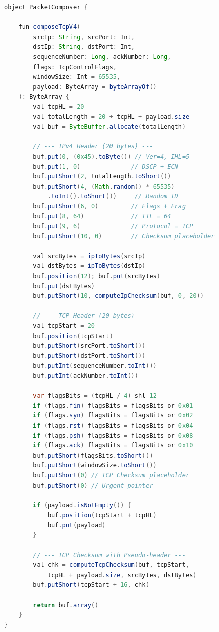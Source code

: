 \begin{lstlisting}[language=Java, caption={PacketComposer.kt --- IPv4 TCP packet synthesis}, label={lst:composer_tcp}]
object PacketComposer {

    fun composeTcpV4(
        srcIp: String, srcPort: Int,
        dstIp: String, dstPort: Int,
        sequenceNumber: Long, ackNumber: Long,
        flags: TcpControlFlags,
        windowSize: Int = 65535,
        payload: ByteArray = byteArrayOf()
    ): ByteArray {
        val tcpHL = 20
        val totalLength = 20 + tcpHL + payload.size
        val buf = ByteBuffer.allocate(totalLength)

        // --- IPv4 Header (20 bytes) ---
        buf.put(0, (0x45).toByte()) // Ver=4, IHL=5
        buf.put(1, 0)              // DSCP + ECN
        buf.putShort(2, totalLength.toShort())
        buf.putShort(4, (Math.random() * 65535)
            .toInt().toShort())     // Random ID
        buf.putShort(6, 0)         // Flags + Frag
        buf.put(8, 64)             // TTL = 64
        buf.put(9, 6)              // Protocol = TCP
        buf.putShort(10, 0)        // Checksum placeholder

        val srcBytes = ipToBytes(srcIp)
        val dstBytes = ipToBytes(dstIp)
        buf.position(12); buf.put(srcBytes)
        buf.put(dstBytes)
        buf.putShort(10, computeIpChecksum(buf, 0, 20))

        // --- TCP Header (20 bytes) ---
        val tcpStart = 20
        buf.position(tcpStart)
        buf.putShort(srcPort.toShort())
        buf.putShort(dstPort.toShort())
        buf.putInt(sequenceNumber.toInt())
        buf.putInt(ackNumber.toInt())

        var flagsBits = (tcpHL / 4) shl 12
        if (flags.fin) flagsBits = flagsBits or 0x01
        if (flags.syn) flagsBits = flagsBits or 0x02
        if (flags.rst) flagsBits = flagsBits or 0x04
        if (flags.psh) flagsBits = flagsBits or 0x08
        if (flags.ack) flagsBits = flagsBits or 0x10
        buf.putShort(flagsBits.toShort())
        buf.putShort(windowSize.toShort())
        buf.putShort(0) // TCP Checksum placeholder
        buf.putShort(0) // Urgent pointer

        if (payload.isNotEmpty()) {
            buf.position(tcpStart + tcpHL)
            buf.put(payload)
        }

        // --- TCP Checksum with Pseudo-header ---
        val chk = computeTcpChecksum(buf, tcpStart,
            tcpHL + payload.size, srcBytes, dstBytes)
        buf.putShort(tcpStart + 16, chk)

        return buf.array()
    }
}
\end{lstlisting}

